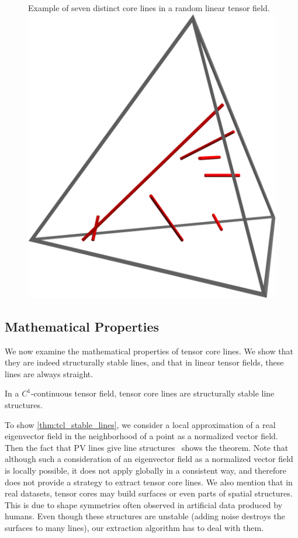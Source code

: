 \begin{figure}
    \begin{captionbeside}
        {Example of seven distinct core lines in a random linear tensor field.
        \label{fig:7lines}}
        \includegraphics[width=0.5\columnwidth]{figures/7lines}
    \end{captionbeside}
\end{figure}
%

\subsection{Mathematical Properties} %
\label{sub:mathematical_properties}
%
We now examine the mathematical properties of tensor core lines.
%
We show that they are indeed structurally stable lines, and that in linear
tensor fields, these lines are always straight.
%

%
\begin{theorem}\label{thm:tcl_stable_lines}
In a $C^1$-continuous tensor field, tensor core lines are
structurally stable line structures.
\end{theorem}
%
To show \cref{thm:tcl_stable_lines}, we consider a local approximation of a real
eigenvector field in the neighborhood of a point as a normalized vector field.
%
Then the fact that \ac{PV} lines give line structures~\cite{Peikert1999} shows
the theorem.
%
Note that although such a consideration of an eigenvector field as a normalized
vector field is locally possible, it does not apply globally in a consistent
way, and therefore does not provide a strategy to extract tensor core lines.
%
We also mention that in real datasets, tensor cores may build surfaces or even
parts of spatial structures.
%
This is due to shape symmetries often observed in artificial data produced by
humans.
%
Even though these structures are unstable (adding noise destroys the surfaces to
many lines), our extraction algorithm has to deal with them.
%

